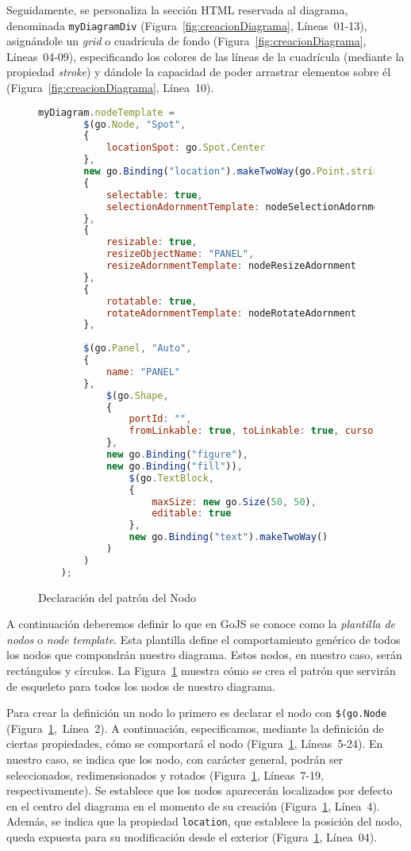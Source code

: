 Seguidamente, se personaliza la sección HTML reservada al diagrama, denominada \texttt{myDiagramDiv} (Figura~\ref{fig:creacionDiagrama}, Líneas~01-13), asignándole un \emph{grid} o cuadrícula de fondo (Figura~\ref{fig:creacionDiagrama}, Líneas~04-09), especificando los colores de las líneas de la cuadrícula (mediante la propiedad \emph{stroke}) y dándole la capacidad de poder arrastrar elementos sobre él (Figura~\ref{fig:creacionDiagrama}, Línea~10).

\begin{figure}[H]
	\centering
	\begin{lstlisting}[language=JavaScript]
	myDiagram.nodeTemplate =
		$(go.Node, "Spot",
		{ 
			locationSpot: go.Spot.Center 
		},
		new go.Binding("location").makeTwoWay(go.Point.stringify),
		{ 
			selectable: true, 
			selectionAdornmentTemplate: nodeSelectionAdornment 
		},
		{ 
			resizable: true, 
			resizeObjectName: "PANEL", 
			resizeAdornmentTemplate: nodeResizeAdornment 
		},
		{ 
			rotatable: true, 
			rotateAdornmentTemplate: nodeRotateAdornment 
		},
		
		$(go.Panel, "Auto",
		{ 
			name: "PANEL" 
		},
			$(go.Shape,
			{
				portId: "",
				fromLinkable: true, toLinkable: true, cursor: "pointer",
			},
			new go.Binding("figure"),
			new go.Binding("fill")),
				$(go.TextBlock,
				{
					maxSize: new go.Size(50, 50),
					editable: true
				},
				new go.Binding("text").makeTwoWay()
			)
		)
	);\end{lstlisting}
	\caption{Declaración del patrón del Nodo}
	\label{fig:patronNodo}
\end{figure}

A continuación deberemos definir lo que en GoJS se conoce como la \emph{plantilla de nodos} o \emph{node template}. Esta plantilla define el comportamiento genérico de todos los nodos que compondrán nuestro diagrama. Estos nodos, en nuestro caso, serán rectángulos y círculos. La Figura~\ref{fig:patronNodo} muestra cómo se crea el patrón que servirán de esqueleto para todos los nodos de nuestro diagrama. 



Para crear la definición un nodo lo primero es declarar el nodo con \texttt{\$(go.Node} (Figura~\ref{fig:patronNodo},~Línea~2).
A continuación, especificamos, mediante la definición de ciertas propiedades, cómo se comportará el nodo (Figura~\ref{fig:patronNodo}, Líneas~5-24). En nuestro caso, se indica que los nodo, con carácter general, podrán ser seleccionados, redimensionados y rotados (Figura~\ref{fig:patronNodo}, Líneas~7-19, respectivamente). Se establece que los nodos aparecerán localizados por defecto en el centro del diagrama en el momento de su creación (Figura~\ref{fig:patronNodo}, Línea~4).
Además, se indica que la propiedad \texttt{location}, que establece la posición del nodo, queda expuesta para su modificación desde el exterior (Figura~\ref{fig:patronNodo}, Línea~04).

